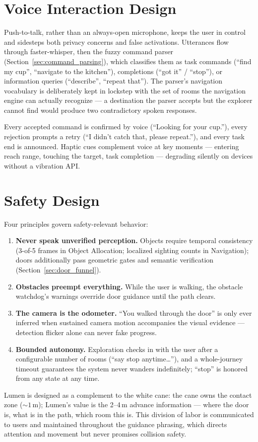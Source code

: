 \section{Voice Interaction Design}
\label{sec:voice_design}

Push-to-talk, rather than an always-open microphone, keeps the user in control and
sidesteps both privacy concerns and false activations. Utterances flow through
faster-whisper, then the fuzzy command parser
(Section~\ref{sec:command_parsing}), which classifies them as task commands
(``find my cup'', ``navigate to the kitchen''), completions (``got it'' /
``stop''), or information queries (``describe'', ``repeat that''). The parser's
navigation vocabulary is deliberately kept in lockstep with the set of rooms the
navigation engine can actually recognize --- a destination the parser accepts but
the explorer cannot find would produce two contradictory spoken responses.

Every accepted command is confirmed by voice (``Looking for your cup.''), every
rejection prompts a retry (``I didn't catch that, please repeat.''), and every task
end is announced. Haptic cues complement voice at key moments --- entering reach
range, touching the target, task completion --- degrading silently on devices
without a vibration API.

\section{Safety Design}
\label{sec:safety_design}

Four principles govern safety-relevant behavior:

\begin{enumerate}[nosep]
  \item \textbf{Never speak unverified perception.} Objects require temporal
        consistency (3-of-5 frames in Object Allocation; localized sighting counts
        in Navigation); doors additionally pass geometric gates and semantic
        verification (Section~\ref{sec:door_funnel}).
  \item \textbf{Obstacles preempt everything.} While the user is walking, the
        obstacle watchdog's warnings override door guidance until the path clears.
  \item \textbf{The camera is the odometer.} ``You walked through the door'' is
        only ever inferred when sustained camera motion accompanies the visual
        evidence --- detection flicker alone can never fake progress.
  \item \textbf{Bounded autonomy.} Exploration checks in with the user after a
        configurable number of rooms (``say stop anytime\ldots''), and a
        whole-journey timeout guarantees the system never wanders indefinitely;
        ``stop'' is honored from any state at any time.
\end{enumerate}

Lumen is designed as a complement to the white cane: the cane owns the contact zone
(${\sim}1$\,m); Lumen's value is the 2--4\,m advance information --- where the door
is, what is in the path, which room this is. This division of labor is communicated
to users and maintained throughout the guidance phrasing, which directs attention
and movement but never promises collision safety.
